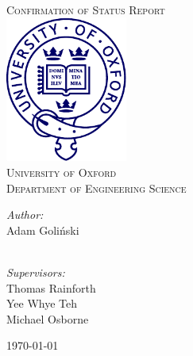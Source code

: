 
\begin{titlepage}
\begin{center}

~\\[2cm]

\textsc{\LARGE Confirmation of Status Report}\\[2cm]

\includegraphics[width=0.3\textwidth]{title/oxford.pdf}\\[2cm]

\textsc{\Large University of Oxford}\\
\textsc{\Large Department of Engineering Science}\\[2cm]


\begin{minipage}{0.4\textwidth}
\begin{flushleft} \large
\emph{Author:}\\
Adam Goli\'{n}ski\\
\text{}\\
\text{}
\end{flushleft}
\end{minipage}
\begin{minipage}{0.4\linewidth}
\begin{flushright} \large
\emph{Supervisors:} \\

Thomas Rainforth \\
Yee Whye Teh \\
Michael Osborne
\end{flushright}
\end{minipage}

\vfill

{\large \today}

\end{center}
\end{titlepage}
